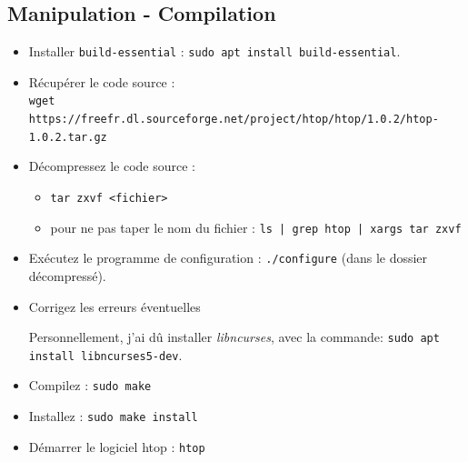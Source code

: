 \documentclass[a4paper]{article}
\begin{document}
\subsection{Manipulation - Compilation}





\begin{itemize}

\item Installer \texttt{build-essential} : \texttt{sudo apt install build-essential}.

\item Récupérer le code source : \\
\texttt{wget https://freefr.dl.sourceforge.net/project/htop/htop/1.0.2/htop-1.0.2.tar.gz}

\item Décompressez le code source :
\begin{example}
    \begin{itemize}
        \item \texttt{tar zxvf <fichier>}
        \item pour ne pas taper le nom du fichier : \texttt{ls | grep htop | xargs tar zxvf}
    \end{itemize}
\end{example}

\item Exécutez le programme de configuration : \texttt{./configure} (dans le dossier décompressé).

\item Corrigez les erreurs éventuelles
\begin{example}
    Personnellement, j'ai dû installer \textit{libncurses}, avec la commande: \texttt{sudo apt install libncurses5-dev}.
\end{example}

\item Compilez : \texttt{sudo make}

\item Installez : \texttt{sudo make install}

\item Démarrer le logiciel htop : \texttt{htop}


\end{itemize}
\end{document}
